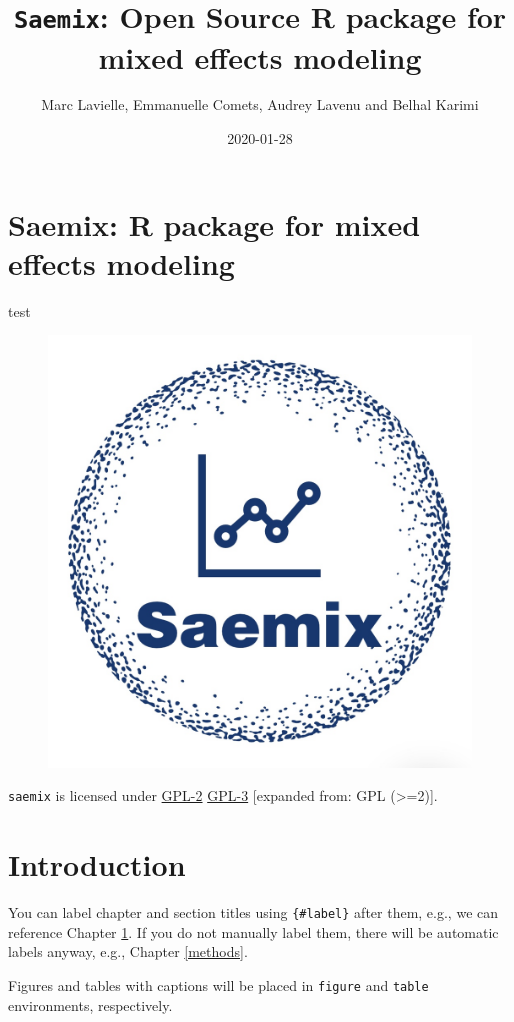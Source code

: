 \documentclass[]{book}
\title{\texttt{Saemix}: Open Source R package for mixed effects modeling}
\author{Marc Lavielle, Emmanuelle Comets, Audrey Lavenu and Belhal Karimi}
\date{2020-01-28}
\begin{document}
\maketitle

{
\hypersetup{linkcolor=black}
\setcounter{tocdepth}{1}
\tableofcontents
}
\chapter*{Saemix: R package for mixed effects
modeling}\label{saemix-r-package-for-mixed-effects-modeling}

test

\begin{figure}

{\centering \includegraphics[width=0.6\linewidth]{figures/logo1} 

}

\end{figure}

\texttt{saemix} is licensed under
\href{https://cran.r-project.org/web/licenses/GPL-2}{GPL-2} \textbar{}
\href{https://cran.r-project.org/web/licenses/GPL-3}{GPL-3} {[}expanded
from: GPL (\textgreater{}=2){]}.

\chapter{Introduction}\label{intro}

You can label chapter and section titles using \texttt{\{\#label\}}
after them, e.g., we can reference Chapter \ref{intro}. If you do not
manually label them, there will be automatic labels anyway, e.g.,
Chapter \ref{methods}.

Figures and tables with captions will be placed in \texttt{figure} and
\texttt{table} environments, respectively.
\end{document}
